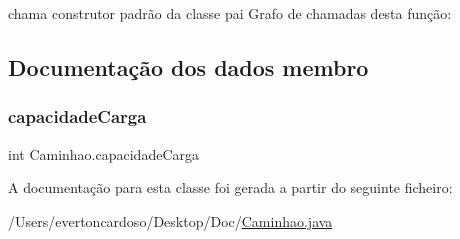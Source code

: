 chama construtor padrão da classe pai Grafo de chamadas desta função\+:


\subsection{Documentação dos dados membro}
\mbox{\label{class_caminhao_a32551c3ccafebc3d06ecb130e6c7cbb5}} 
\subsubsection{\texorpdfstring{capacidade\+Carga}{capacidadeCarga}}
{\footnotesize\ttfamily int Caminhao.\+capacidade\+Carga\hspace{0.3cm}{\ttfamily [protected]}}



A documentação para esta classe foi gerada a partir do seguinte ficheiro\+:\begin{DoxyCompactItemize}
\item 
/\+Users/evertoncardoso/\+Desktop/\+Doc/\mbox{\hyperlink{_caminhao_8java}{Caminhao.\+java}}\end{DoxyCompactItemize}
